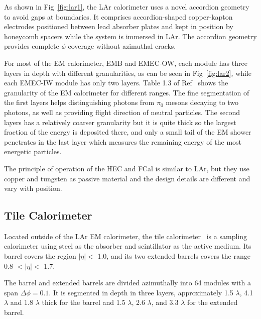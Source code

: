 \par As shown in Fig~\ref{fig:lar1}, the LAr calorimeter uses a novel accordion geometry to avoid gaps at boundaries. It comprises accordion-shaped copper-kapton electrodes positioned between lead absorber plates and kept in position by honeycomb spacers while the system is immersed in LAr. The accordion geometry provides complete $\phi$ coverage without azimuthal cracks.

\par For most of the EM calorimeter, EMB and EMEC-OW, each module has three layers in depth with different granularities, 
as can be seen in Fig~\ref{fig:lar2}, while each EMEC-IW module has only two layers. Table 1.3 of Ref~\cite{Aad:1129811} 
shows the granularity of the EM calorimeter for different ranges. The fine segmentation of the first layers helps distinguishing photons from $\pi_0$ mesons decaying to two photons, as well as providing flight direction of neutral particles. The second layers has a relatively coarser granularity but it is quite thick so the largest fraction of the energy is deposited there, and only a small tail of the EM shower penetrates in the last layer which measures the remaining energy of the most energetic particles.

\par The principle of operation of the HEC and FCal is similar to LAr, but they use copper and tungsten as passive material and the design details are different and vary with position.

\subsection{Tile Calorimeter}

\par Located outside of the LAr EM calorimeter, the tile calorimeter~\cite{CERN-LHCC-96-042} is a sampling calorimeter using steel as the absorber and scintillator as the active medium. Its barrel covers the region $|\eta| <$ 1.0, and its two extended barrels covers the range 0.8 $< |\eta| <$ 1.7.

\par The barrel and extended barrels are divided azimuthally into 64 modules with a span $\Delta \phi = 0.1$. It is segmented in depth in three layers, approximately 1.5 $\lambda$, 4.1 $\lambda$ and 1.8 $\lambda$ thick for the barrel and 1.5 $\lambda$, 2.6 $\lambda$, and 3.3 $\lambda$ for the extended barrel.

